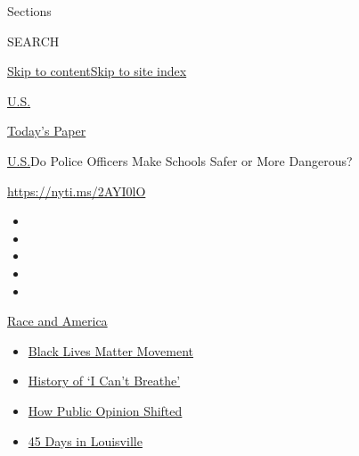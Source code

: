 Sections

SEARCH

\protect\hyperlink{site-content}{Skip to
content}\protect\hyperlink{site-index}{Skip to site index}

\href{https://www.nytimes.com/section/us}{U.S.}

\href{https://myaccount.nytimes.com/auth/login?response_type=cookie\&client_id=vi}{}

\href{https://www.nytimes.com/section/todayspaper}{Today's Paper}

\href{/section/us}{U.S.}\textbar{}Do Police Officers Make Schools Safer
or More Dangerous?

\url{https://nyti.ms/2AYI0lO}

\begin{itemize}
\item
\item
\item
\item
\item
\end{itemize}

\href{https://www.nytimes.com/news-event/george-floyd-protests-minneapolis-new-york-los-angeles?action=click\&pgtype=Article\&state=default\&region=TOP_BANNER\&context=storylines_menu}{Race
and America}

\begin{itemize}
\tightlist
\item
  \href{https://www.nytimes.com/interactive/2020/07/03/us/george-floyd-protests-crowd-size.html?action=click\&pgtype=Article\&state=default\&region=TOP_BANNER\&context=storylines_menu}{Black
  Lives Matter Movement}
\item
  \href{https://www.nytimes.com/interactive/2020/06/28/us/i-cant-breathe-police-arrest.html?action=click\&pgtype=Article\&state=default\&region=TOP_BANNER\&context=storylines_menu}{History
  of `I Can't Breathe'}
\item
  \href{https://www.nytimes.com/interactive/2020/06/10/upshot/black-lives-matter-attitudes.html?action=click\&pgtype=Article\&state=default\&region=TOP_BANNER\&context=storylines_menu}{How
  Public Opinion Shifted}
\item
  \href{https://www.nytimes.com/interactive/2020/07/16/us/black-lives-matter-protests-louisville-breonna-taylor.html?action=click\&pgtype=Article\&state=default\&region=TOP_BANNER\&context=storylines_menu}{45
  Days in Louisville}
\end{itemize}

